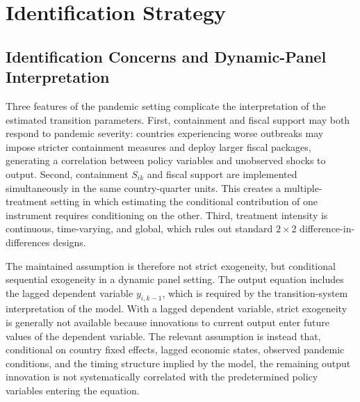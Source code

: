 \documentclass[12pt, a4paper]{article}
\begin{document}
\section{Identification Strategy}
\label{app:identification}

\subsection{Identification Concerns and Dynamic-Panel Interpretation}
\label{app:concerns}

Three features of the pandemic setting complicate the interpretation of the
estimated transition parameters. First, containment and fiscal support may both
respond to pandemic severity: countries experiencing worse outbreaks may impose
stricter containment measures and deploy larger fiscal packages, generating a
correlation between policy variables and unobserved shocks to output. Second,
containment $S_{ik}$ and fiscal support are implemented simultaneously in the
same country-quarter units. This creates a multiple-treatment setting in which
estimating the conditional contribution of one instrument requires conditioning
on the other. Third, treatment intensity is continuous, time-varying, and
global, which rules out standard $2\times2$ difference-in-differences designs.

The maintained assumption is therefore not strict exogeneity, but conditional
sequential exogeneity in a dynamic panel setting. The output equation includes
the lagged dependent variable $y_{i,k-1}$, which is required by the
transition-system interpretation of the model. With a lagged dependent
variable, strict exogeneity is generally not available because innovations to
current output enter future values of the dependent variable. The relevant
assumption is instead that, conditional on country fixed effects, lagged
economic states, observed pandemic conditions, and the timing structure implied
by the model, the remaining output innovation is not systematically correlated
with the predetermined policy variables entering the equation.
\end{document}
